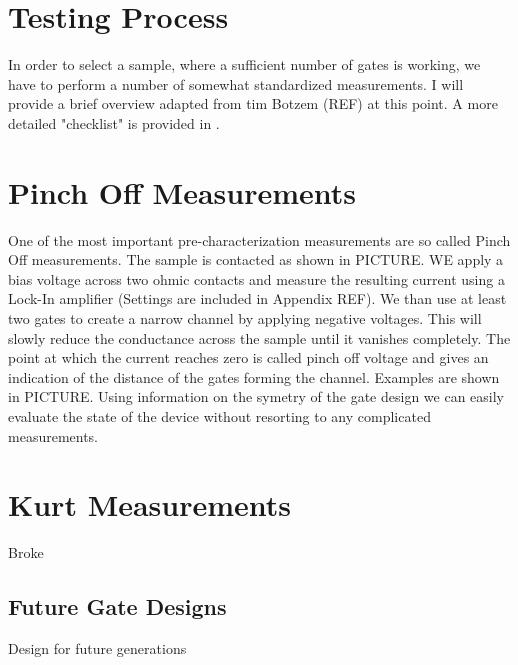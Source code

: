 \section{Testing Process}
In order to select a sample, where a sufficient number of gates is working, we have to perform a number of somewhat standardized measurements. I will provide a brief overview adapted from tim Botzem (REF) at this point. A more detailed "checklist" is provided in .

\section{Pinch Off Measurements}
One of the most important pre-characterization measurements are so called Pinch Off measurements. The sample is contacted as shown in PICTURE. WE apply a bias voltage across two ohmic contacts and measure the resulting current using a Lock-In amplifier (Settings are included in Appendix REF). We than use at least two gates to create a narrow channel by applying negative voltages. This will slowly reduce the conductance across the sample until it vanishes completely. The point at which the current reaches zero is called pinch off voltage and gives an indication of the distance of the gates forming the channel. Examples are shown in PICTURE.
Using information on the symetry of the gate design we can easily evaluate the state of the device without resorting to any complicated measurements.

\section{Kurt Measurements}
Broke
\subsection{Future Gate Designs}
Design for future generations